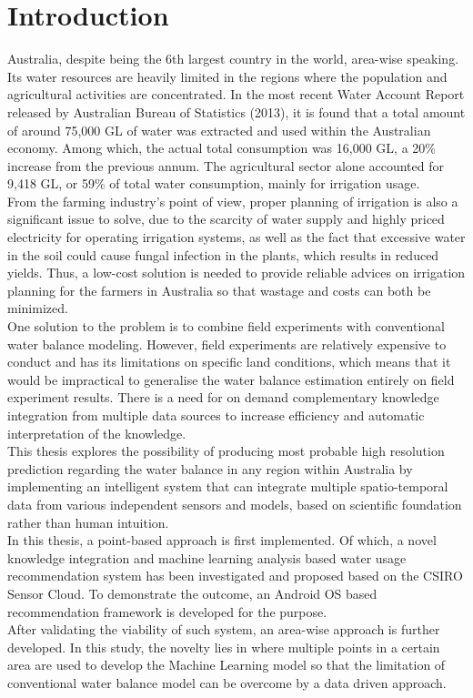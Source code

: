 \documentclass[12pt,journal,compsoc,onecolumn]{IEEEtran}
\begin{document}
\section{Introduction}
Australia, despite being the 6th largest country in the world, area-wise speaking. Its water resources are heavily limited in the regions where the population and agricultural activities are concentrated. In the most recent Water Account Report released by Australian Bureau of Statistics (2013\cite{Statistics2013}), it is found that a total amount of around 75,000 GL of water was extracted and used within the Australian economy. Among which, the actual total consumption was 16,000 GL, a 20\% increase from the previous annum. The agricultural sector alone accounted for 9,418 GL, or 59\% of total water consumption, mainly for irrigation usage.\\
\newline
From the farming industry's point of view, proper planning of irrigation is also a significant issue to solve, due to the scarcity of water supply and highly priced electricity for operating irrigation systems, as well as the fact that excessive water in the soil could cause fungal infection in the plants\cite{Wong1984}, which results in reduced yields. Thus, a low-cost solution is needed to provide reliable advices on irrigation planning for the farmers in Australia so that wastage and costs can both be minimized. \\
\newline
One solution to the problem is to combine field experiments with conventional water balance modeling. However, field experiments are relatively expensive to conduct and has its limitations on specific land conditions, which means that it would be impractical to generalise the water balance estimation entirely on field experiment results. There is a need for on demand complementary knowledge integration from multiple data sources to increase efficiency and automatic interpretation of the knowledge.\\
\newline
This thesis explores the possibility of producing most probable high resolution prediction regarding the water balance in any region within Australia by implementing an intelligent system that can integrate multiple spatio-temporal data from various independent sensors and models, based on scientific foundation rather than human intuition.\\
\newline
In this thesis, a point-based approach is first implemented. Of which, a novel knowledge integration and machine learning analysis based water usage recommendation system has been investigated and proposed based on the CSIRO Sensor Cloud. To demonstrate the outcome, an Android OS based recommendation framework is developed for the purpose.\\
\newline
After validating the viability of such system, an area-wise approach is further developed. In this study, the novelty lies in where multiple points in a certain area are used to develop the Machine Learning model so that the limitation of conventional water balance model can be overcome by a data driven approach. 
\end{document}
